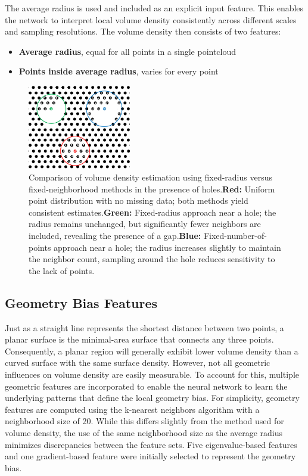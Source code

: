 The average radius is used and included as an explicit input feature. This enables the network to interpret local volume density consistently across different scales and sampling resolutions.
The volume density then consists of two features:
\begin{itemize}
    \item \textbf{Average radius}, equal for all points in a single pointcloud 
    \item \textbf{Points inside average radius}, varies for every point
\end{itemize}

\begin{figure}[H]
    \centering
    \includegraphics[width=0.4\textwidth]{figures/RadiusVSPoint_based.png}
    \caption{Comparison of volume density estimation using fixed-radius versus fixed-neighborhood methods in the presence of holes.\textbf{Red:} Uniform point distribution with no missing data; both methods yield consistent estimates.\textbf{Green:} Fixed-radius approach near a hole; the radius remains unchanged, but significantly fewer neighbors are included, revealing the presence of a gap.\textbf{Blue:} Fixed-number-of-points approach near a hole; the radius increases slightly to maintain the neighbor count, sampling around the hole reduces sensitivity to the lack of points.}\label{fig:radVSnbh_VD}
\end{figure}

\subsection*{Geometry Bias Features}
Just as a straight line represents the shortest distance between two points, a planar surface is the minimal-area surface that connects any three points. Consequently, a planar region will generally exhibit lower volume density than a curved surface with the same surface density. However, not all geometric influences on volume density are easily measurable. To account for this, multiple geometric features are incorporated to enable the neural network to learn the underlying patterns that define the local geometry bias.
For simplicity, geometry features are computed using the k-nearest neighbors algorithm with a neighborhood size of 20. While this differs slightly from the method used for volume density, the use of the same neighborhood size as the average radius minimizes discrepancies between the feature sets. Five eigenvalue-based features and one gradient-based feature were initially selected to represent the geometry bias. 

